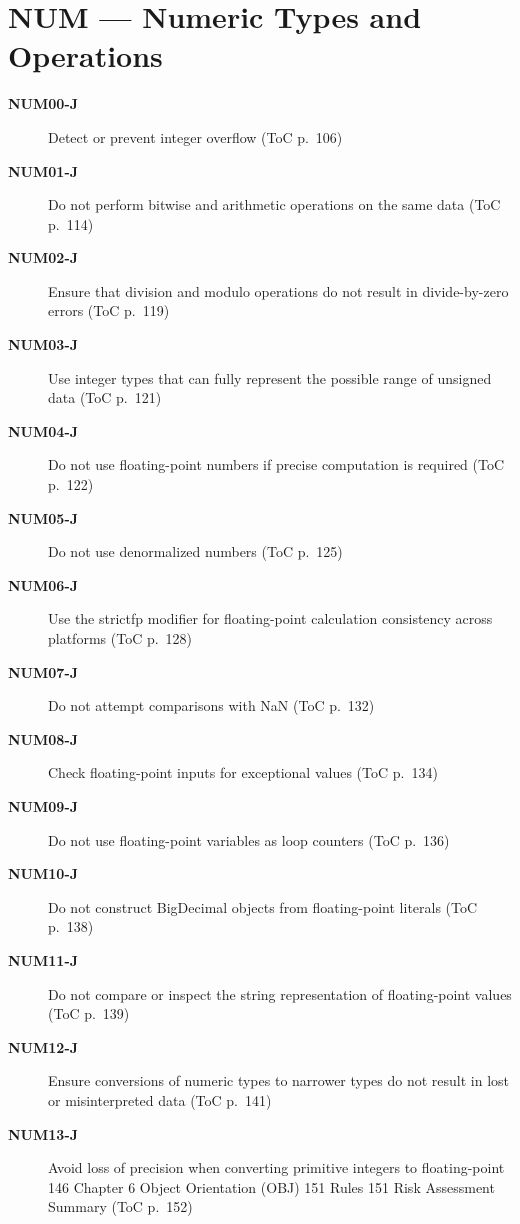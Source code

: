 \documentclass[11pt]{report}
\begin{document}
\chapter{NUM — Numeric Types and Operations}
\begin{description}
\item[\textbf{NUM00-J}] Detect or prevent integer overflow (ToC p.~106)
\item[\textbf{NUM01-J}] Do not perform bitwise and arithmetic operations on the same data (ToC p.~114)
\item[\textbf{NUM02-J}] Ensure that division and modulo operations do not result in divide-by-zero errors (ToC p.~119)
\item[\textbf{NUM03-J}] Use integer types that can fully represent the possible range of unsigned data (ToC p.~121)
\item[\textbf{NUM04-J}] Do not use floating-point numbers if precise computation is required (ToC p.~122)
\item[\textbf{NUM05-J}] Do not use denormalized numbers (ToC p.~125)
\item[\textbf{NUM06-J}] Use the strictfp modifier for floating-point calculation consistency across platforms (ToC p.~128)
\item[\textbf{NUM07-J}] Do not attempt comparisons with NaN (ToC p.~132)
\item[\textbf{NUM08-J}] Check floating-point inputs for exceptional values (ToC p.~134)
\item[\textbf{NUM09-J}] Do not use floating-point variables as loop counters (ToC p.~136)
\item[\textbf{NUM10-J}] Do not construct BigDecimal objects from floating-point literals (ToC p.~138)
\item[\textbf{NUM11-J}] Do not compare or inspect the string representation of floating-point values (ToC p.~139)
\item[\textbf{NUM12-J}] Ensure conversions of numeric types to narrower types do not result in lost or misinterpreted data (ToC p.~141)
\item[\textbf{NUM13-J}] Avoid loss of precision when converting primitive integers to floating-point 146 Chapter 6 Object Orientation (OBJ) 151 Rules 151 Risk Assessment Summary (ToC p.~152)
\end{description}
\clearpage
\end{document}
